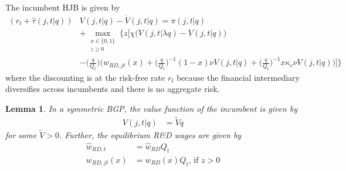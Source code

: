 \documentclass[11pt,english]{article}
\newtheorem{lemma}{Lemma}
\begin{document}
The incumbent HJB is given by 
\begin{align}
(r_t + \hat{\tau}(j,t|q)) &V(j,t |q) - \dot{V}(j,t|q) = \pi(j,t|q) \nonumber \\_{}
&+ \max_{\substack{x \in \{0,1\} \\ z \ge 0}} \Bigg\{ z \Big[ \chi \big( V(j,t|\lambda q) - V(j,t|q)\big)  \nonumber \\
&- \big(\frac{q}{Q_t}\big) \Big( w_{RD,jt}(x) + \big(\frac{q}{Q_t}\big)^{-1} (1-x) \nu V(j,t|q) + \big(\frac{q}{Q_t}\big)^{-1}  x \kappa_c \nu V(j,t|q) \Big)  \Big] \Bigg\} \label{eq:hjb_incumbent_0}
\end{align}
where the discounting is at the risk-free rate $r_t$ because the financial intermediary diversifies across incumbents and there is no aggregate risk.

\begin{lemma}\label{lemma:hjb_scaling}
	In a symmetric BGP, the value function of the incumbent is given by
	\begin{align*}
		V(j,t|q) &= \tilde{V} q
	\end{align*}
	for some $\tilde{V} > 0$. Further, the equilibrium R\&D wages are given by 
	\begin{align*}
		\hat{w}_{RD,t} &= \hat{w}_{RD} Q_t \\
		w_{RD,jt}(x) &= w_{RD}(x) Q_t \textrm{, if $z > 0$}
	\end{align*}
\end{lemma}
\end{document}
